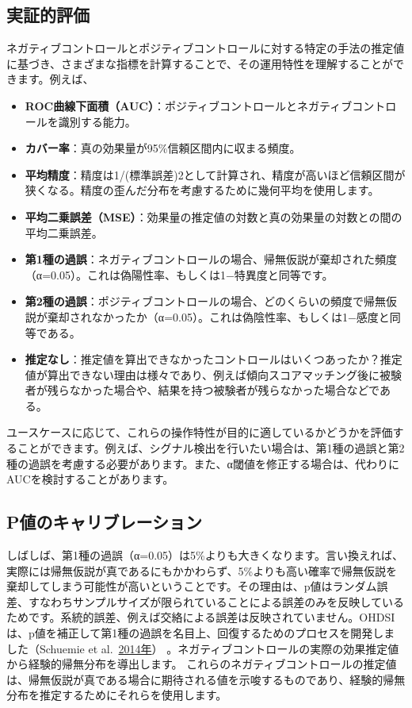 \documentclass[
  11pt]{book}
\theoremstyle{definition}
\theoremstyle{definition}
\theoremstyle{definition}
\theoremstyle{definition}
\theoremstyle{remark}
\begin{document}
\subsection{実証的評価}\label{metrics}


ネガティブコントロールとポジティブコントロールに対する特定の手法の推定値に基づき、さまざまな指標を計算することで、その運用特性を理解することができます。例えば、

\begin{itemize}
\item
  \textbf{ROC曲線下面積（AUC）}：ポジティブコントロールとネガティブコントロールを識別する能力。
\item
  \textbf{カバー率}：真の効果量が95\%信頼区間内に収まる頻度。
\item
  \textbf{平均精度}：精度は1/(標準誤差)2として計算され、精度が高いほど信頼区間が狭くなる。精度の歪んだ分布を考慮するために幾何平均を使用します。
\item
  \textbf{平均二乗誤差（MSE）}：効果量の推定値の対数と真の効果量の対数との間の平均二乗誤差。
\item
  \textbf{第1種の過誤}：ネガティブコントロールの場合、帰無仮説が棄却された頻度（α=0.05）。これは偽陽性率、もしくは1−特異度と同等です。
\item
  \textbf{第2種の過誤}：ポジティブコントロールの場合、どのくらいの頻度で帰無仮説が棄却されなかったか（α=0.05）。これは偽陰性率、もしくは1−感度と同等である。
\item
  \textbf{推定なし}：推定値を算出できなかったコントロールはいくつあったか？推定値が算出できない理由は様々であり、例えば傾向スコアマッチング後に被験者が残らなかった場合や、結果を持つ被験者が残らなかった場合などである。
\end{itemize}

ユースケースに応じて、これらの操作特性が目的に適しているかどうかを評価することができます。例えば、シグナル検出を行いたい場合は、第1種の過誤と第2種の過誤を考慮する必要があります。また、α閾値を修正する場合は、代わりにAUCを検討することがあります。

\subsection{P値のキャリブレーション}\label{pux5024ux306eux30adux30e3ux30eaux30d6ux30ecux30fcux30b7ux30e7ux30f3}

 

しばしば、第1種の過誤（α=0.05）は5\%よりも大きくなります。言い換えれば、実際には帰無仮説が真であるにもかかわらず、5\%よりも高い確率で帰無仮説を棄却してしまう可能性が高いということです。その理由は、p値はランダム誤差、すなわちサンプルサイズが限られていることによる誤差のみを反映しているためです。系統的誤差、例えば交絡による誤差は反映されていません。OHDSIは、p値を補正して第1種の過誤を名目上、回復するためのプロセスを開発しました（Schuemie et al.~\href{https://ohdsi.github.io/TheBookOfOhdsi/MethodValidity.html\#ref-schuemie_2014}{2014年}） 。ネガティブコントロールの実際の効果推定値から経験的帰無分布を導出します。 これらのネガティブコントロールの推定値は、帰無仮説が真である場合に期待される値を示唆するものであり、経験的帰無分布を推定するためにそれらを使用します。
\end{document}
